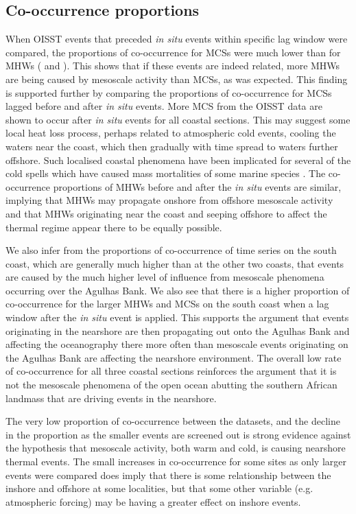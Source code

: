\documentclass[a4paper,10pt,review]{elsarticle}
\begin{document}
\subsection{Co-occurrence proportions}
When OISST events that preceded \emph{in situ} events within specific lag window were compared, the proportions of co-occurrence for MCSs were much lower than for MHWs ( and ). This shows that if these events are indeed related, more MHWs are being caused by mesoscale activity than MCSs, as was expected. This finding is supported further by comparing the proportions of co-occurrence for MCSs lagged before and after \emph{in situ} events. More MCS from the OISST data are shown to occur after \emph{in situ} events for all coastal sections. This may suggest some local heat loss process, perhaps related to atmospheric cold events, cooling the waters near the coast, which then gradually with time spread to waters further offshore. Such localised coastal phenomena have been implicated for several of the cold spells which have caused mass mortalities of some marine species \citep[e.g.][]{Gunter1941, Firth2011}. The co-occurrence proportions of MHWs before and after the \emph{in situ} events are similar, implying that MHWs may propagate onshore from offshore mesoscale activity and that MHWs originating near the coast and seeping offshore to affect the thermal regime appear there to be equally possible.

We also infer from the proportions of co-occurrence of time series on the south coast, which are generally much higher than at the other two coasts, that events are caused by the much higher level of influence from mesoscale phenomena occurring over the Agulhas Bank. We also see that there is a higher proportion of co-occurrence for the larger MHWs and MCSs on the south coast when a lag window after the \emph{in situ} event is applied. This supports the argument that events originating in the nearshore are then propagating out onto the Agulhas Bank and affecting the oceanography there more often than mesoscale events originating on the Agulhas Bank are affecting the nearshore environment. The overall low rate of co-occurrence for all three coastal sections reinforces the argument that it is not the mesoscale phenomena of the open ocean abutting the southern African landmass that are driving events in the nearshore.

The very low proportion of co-occurrence between the datasets, and the decline in the proportion as the smaller events are screened out is strong evidence against the hypothesis that mesoscale activity, both warm and cold, is causing nearshore thermal events. The small increases in co-occurrence for some sites as only larger events were compared does imply that there is some relationship between the inshore and offshore at some localities, but that some other variable (e.g. atmospheric forcing) may be having a greater effect on inshore events.
\end{document}
